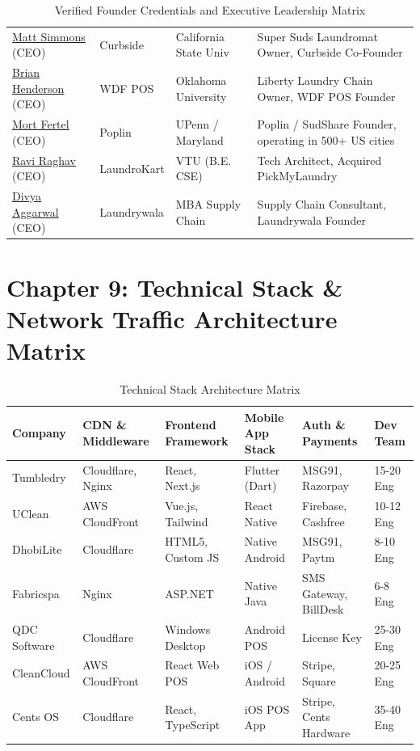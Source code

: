 \documentclass[11pt,a4paper]{article}
\begin{document}
\begin{table}[h!]
\begin{tabularx}{\textwidth}{XXXX}
\href{https://www.linkedin.com/in/mattsimmons88/}{\underline{Matt Simmons}} (CEO) & Curbside & California State Univ & Super Suds Laundromat Owner, Curbside Co-Founder \\
\href{https://www.linkedin.com/in/brianhenderson/}{\underline{Brian Henderson}} (CEO) & WDF POS & Oklahoma University & Liberty Laundry Chain Owner, WDF POS Founder \\
\href{https://www.linkedin.com/in/mortfertel/}{\underline{Mort Fertel}} (CEO) & Poplin & UPenn / Maryland & Poplin / SudShare Founder, operating in 500+ US cities \\
\href{https://www.linkedin.com/in/ravi-raghav-67a32115/}{\underline{Ravi Raghav}} (CEO) & LaundroKart & VTU (B.E. CSE) & Tech Architect, Acquired PickMyLaundry \\
\href{https://www.linkedin.com/in/divya-aggarwal-8910a221/}{\underline{Divya Aggarwal}} (CEO) & Laundrywala & MBA Supply Chain & Supply Chain Consultant, Laundrywala Founder \\
\bottomrule
\end{tabularx}
\caption{Verified Founder Credentials and Executive Leadership Matrix}
\end{table}

\clearpage

\section{Chapter 9: Technical Stack \& Network Traffic Architecture Matrix}

\begin{table}[h!]
\centering
\scriptsize
\begin{tabularx}{\textwidth}{XXXXXX}
\toprule
\textbf{Company} & \textbf{CDN \& Middleware} & \textbf{Frontend Framework} & \textbf{Mobile App Stack} & \textbf{Auth \& Payments} & \textbf{Dev Team} \\
\midrule
Tumbledry & Cloudflare, Nginx & React, Next.js & Flutter (Dart) & MSG91, Razorpay & 15-20 Eng \\
UClean & AWS CloudFront & Vue.js, Tailwind & React Native & Firebase, Cashfree & 10-12 Eng \\
DhobiLite & Cloudflare & HTML5, Custom JS & Native Android & MSG91, Paytm & 8-10 Eng \\
Fabricspa & Nginx & ASP.NET & Native Java & SMS Gateway, BillDesk & 6-8 Eng \\
QDC Software & Cloudflare & Windows Desktop & Android POS & License Key & 25-30 Eng \\
CleanCloud & AWS CloudFront & React Web POS & iOS / Android & Stripe, Square & 20-25 Eng \\
Cents OS & Cloudflare & React, TypeScript & iOS POS App & Stripe, Cents Hardware & 35-40 Eng \\
\bottomrule
\end{tabularx}
\caption{Technical Stack Architecture Matrix}
\end{table}
\end{document}
